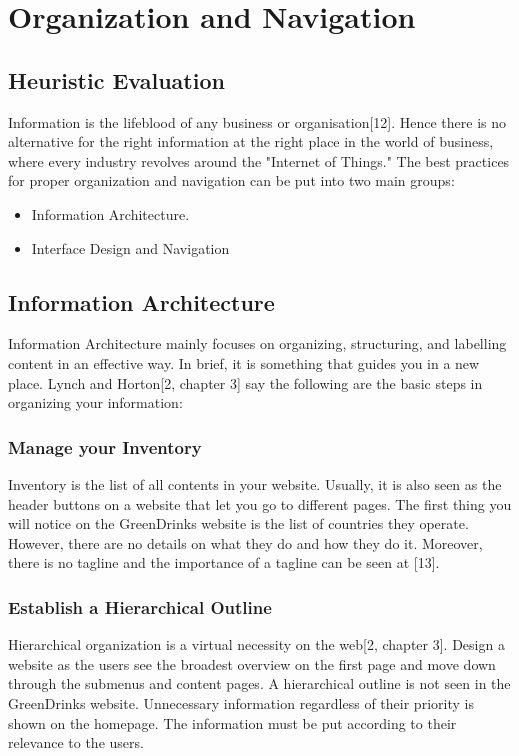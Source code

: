\documentclass[12pt]{article}
\begin{document}
\section{Organization and Navigation}
\subsection{Heuristic Evaluation}
Information is the lifeblood of any business or organisation[12]. Hence there is no alternative for the right information at the right place in the world of business, where every industry revolves around the "Internet of Things." The best practices for proper organization and navigation can be put into two  main groups:
\begin{itemize}
\item Information Architecture.
\item Interface Design and Navigation
\end{itemize}

\subsection*{Information Architecture} 
Information Architecture mainly focuses on organizing, structuring, and labelling content in an effective way. In brief, it is something that guides you in a new place. Lynch and Horton[2, chapter 3] say the following are the basic steps in organizing your information:
\subsubsection*{Manage your Inventory}
Inventory is the list of all contents in your website.  Usually, it is also seen as the header buttons on a website that let you go to different pages. The first thing you will notice on the GreenDrinks website is the list of countries they operate.  However, there are no details on what they do and how they do it. Moreover, there is no tagline and the importance of a tagline can be seen at [13]. 

\subsubsection*{Establish a Hierarchical Outline}
Hierarchical organization is a virtual necessity on the web[2, chapter 3]. Design a website as the users see the broadest overview on the first page and move down through the submenus and content pages.  A hierarchical outline is not seen in the GreenDrinks website. Unnecessary information regardless of their priority is shown on the homepage. The information must be put according to their relevance to the users.
\end{document}
